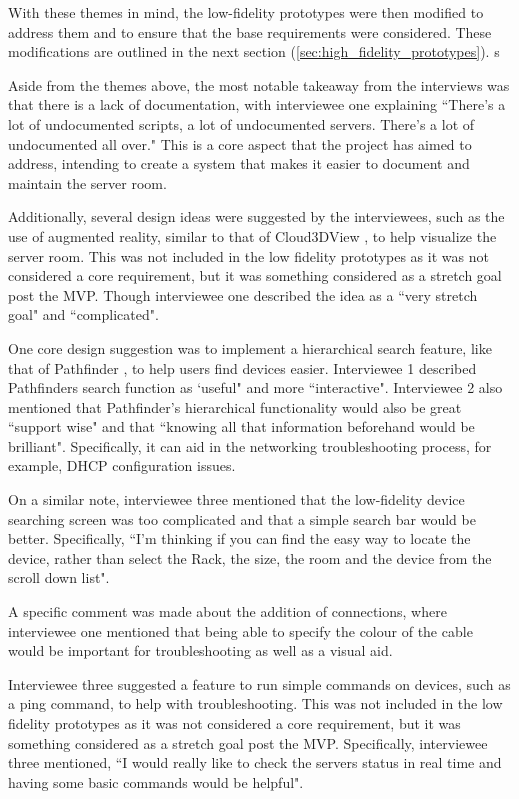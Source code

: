 \documentclass [11pt,a4paper]{article}
\begin{document}
With these themes in mind, the low-fidelity prototypes were then modified to address them and to ensure that the base requirements were considered. These modifications are outlined in the next section (\ref{sec:high_fidelity_prototypes}). s

Aside from the themes above, the most notable takeaway from the interviews was that there is a lack of documentation, with interviewee one explaining ``There's a lot of undocumented scripts, a lot of undocumented servers. There's a lot of undocumented all over." This is a core aspect that the project has aimed to address, intending to create a system that makes it easier to document and maintain the server room. 

Additionally, several design ideas were suggested by the interviewees, such as the use of augmented reality, similar to that of Cloud3DView \cite{cloud3dview}, to help visualize the server room. This was not included in the low fidelity prototypes as it was not considered a core requirement, but it was something considered as a stretch goal post the MVP. Though interviewee one described the idea as a ``very stretch goal" and ``complicated".

One core design suggestion was to implement a hierarchical search feature, like that of Pathfinder \cite{PathfinderMobile}, to help users find devices easier. Interviewee 1 described Pathfinders search function as `useful" and more ``interactive". Interviewee 2 also mentioned that Pathfinder's hierarchical functionality would also be great ``support wise" and that ``knowing all that information beforehand would be brilliant". Specifically, it can aid in the networking troubleshooting process, for example, DHCP configuration issues.

On a similar note, interviewee three mentioned that the low-fidelity device searching screen was too complicated and that a simple search bar would be better. Specifically, ``I'm thinking if you can find the easy way to locate the device, rather than select the Rack, the size, the room and the device from the scroll down list". 

A specific comment was made about the addition of connections, where interviewee one mentioned that being able to specify the colour of the cable would be important for troubleshooting as well as a visual aid.  

Interviewee three suggested a feature to run simple commands on devices, such as a ping command, to help with troubleshooting. This was not included in the low fidelity prototypes as it was not considered a core requirement, but it was something considered as a stretch goal post the MVP. Specifically, interviewee three mentioned, ``I would really like to check the servers status in real time and having some basic commands would be helpful".
\end{document}
